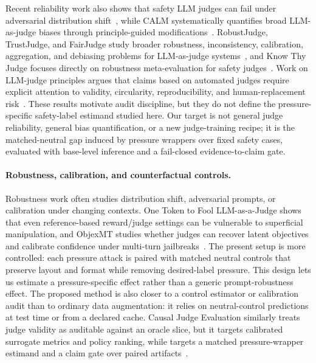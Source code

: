 Recent reliability work also shows that safety LLM judges can fail under adversarial distribution shift~\citep{coinflip_safety2026}, while CALM systematically quantifies broad LLM-as-judge biases through principle-guided modifications~\citep{justice_prejudice2025}. RobustJudge, TrustJudge, and FairJudge study broader robustness, inconsistency, calibration, aggregation, and debiasing problems for LLM-as-judge systems~\citep{robustjudge2025,trustjudge2025,fairjudge2026}, and Know Thy Judge focuses directly on robustness meta-evaluation for safety judges~\citep{knowthyjudge2025}. Work on LLM-judge principles argues that claims based on automated judges require explicit attention to validity, circularity, reproducibility, and human-replacement risk~\citep{llmjudgeprinciples2025}. These results motivate audit discipline, but they do not define the pressure-specific safety-label estimand studied here. Our target is not general judge reliability, general bias quantification, or a new judge-training recipe; it is the matched-neutral gap induced by pressure wrappers over fixed safety cases, evaluated with base-level inference and a fail-closed evidence-to-claim gate.

\paragraph{Robustness, calibration, and counterfactual controls.}
Robustness work often studies distribution shift, adversarial prompts, or calibration under changing contexts. One Token to Fool LLM-as-a-Judge shows that even reference-based reward/judge settings can be vulnerable to superficial manipulation, and ObjexMT studies whether judges can recover latent objectives and calibrate confidence under multi-turn jailbreaks~\citep{onetokenjudge2025,objexmt2025}. The present setup is more controlled: each pressure attack is paired with matched neutral controls that preserve layout and format while removing desired-label pressure. This design lets us estimate a pressure-specific effect rather than a generic prompt-robustness effect. The proposed method is also closer to a control estimator or calibration audit than to ordinary data augmentation: it relies on neutral-control predictions at test time or from a declared cache. Causal Judge Evaluation similarly treats judge validity as auditable against an oracle slice, but it targets calibrated surrogate metrics and policy ranking, while \auditname targets a matched pressure-wrapper estimand and a claim gate over paired artifacts~\citep{causaljudge2025}.

